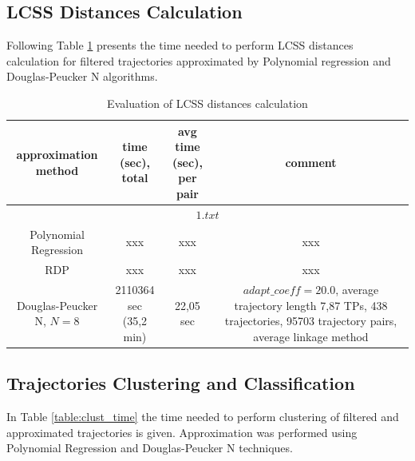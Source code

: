 \subsection{LCSS Distances Calculation}

Following Table \ref{table:lcss_dist_time} presents the time needed to perform LCSS distances calculation for filtered trajectories approximated by Polynomial regression and Douglas-Peucker N algorithms.

\begin{table}[!htb]
	\caption{Evaluation of LCSS distances calculation}
	\label{table:lcss_dist_time}
	
	\setlength{\tabcolsep}{10pt}
	\centering
	\setcellgapes{3pt}\makegapedcells
	
	\begin{tabular}{||c|c|c|c||}
		\hline
		\makecell{approximation\\method} & \makecell{time (sec),\\total} & \makecell{avg time (sec),\\per pair} & comment \\[0.5ex]
		\hline
		\multicolumn{4}{||c||}{$1.txt$} \\[0.5ex]
		\hline
		Polynomial Regression 	& xxx 	& xxx	& xxx \\[0.5ex]
		\hline
		RDP 	& xxx 	& xxx	& xxx \\[0.5ex]
		\hline
		\makecell{Douglas-Peucker N,\\$N = 8$} 	& \makecell{2110364 sec\\(35,2 min)} 	& 22,05 sec & \makecell{$adapt\_coeff = 20.0$,\\average trajectory length\\7,87 TPs,\\438 trajectories,\\95703 trajectory pairs,\\average linkage method} \\[0.5ex]
		\hline
	\end{tabular}
\end{table}

\subsection{Trajectories Clustering and Classification}

In Table \ref{table:clust_time} the time needed to perform clustering of filtered and approximated trajectories is given. Approximation was performed using Polynomial Regression and Douglas-Peucker N techniques.

